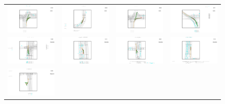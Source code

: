 \begin{figure}[t]
\begin{tabular}{cccc}
\includegraphics[width=0.24\linewidth]{figures/supp/curve1.pdf}
&\includegraphics[width=0.24\linewidth]{figures/supp/curve2.pdf}
&\includegraphics[width=0.24\linewidth]{figures/supp/curve3.pdf}
&\includegraphics[width=0.24\linewidth]{figures/supp/curve4.pdf}\\
\includegraphics[width=0.24\linewidth]{figures/supp/inter1.pdf}
&\includegraphics[width=0.24\linewidth]{figures/supp/inter2.pdf}
&\includegraphics[width=0.24\linewidth]{figures/supp/inter3.pdf}
&\includegraphics[width=0.24\linewidth]{figures/supp/inter4.pdf}\\
\includegraphics[width=0.24\linewidth]{figures/supp/map1.pdf}

\end{tabular}
\end{figure}

